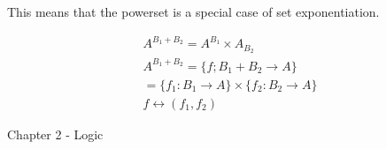 \documentclass{report}
\begin{document}
\begin{itemize}
\begin{mdframed}
            This means that the powerset is a special
            case of set exponentiation.
        \end{mdframed}

        \begin{gather}
            A^{B_1 + B_2} = A^{B_1} \times A_{B_2}\\ 
            A^{B_1 + B_2} = \{f; B_1 + B_2 \to A \}\\
            = \{f_1: B_1 \to A \} \times \{f_2: B_2 \to A \}\\
            f \leftrightarrow (f_1, f_2)
        \end{gather}




\end{itemize}
\pagebreak
{\huge Chapter 2 - Logic}
\end{document}
